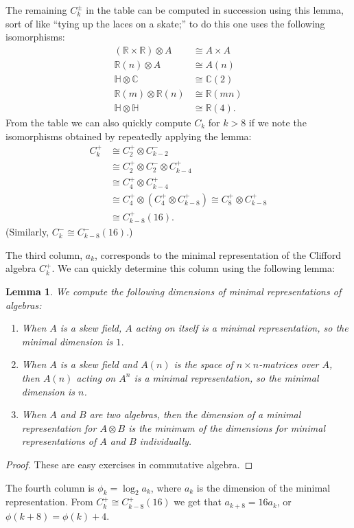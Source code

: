 \documentclass{article}
\newcommand{\C}{\mathbb{C}}
\newcommand{\R}{\mathbb{R}}
\newtheorem{lem}[thm]{Lemma}
\begin{document}
The remaining $C_k^\pm$ in the table can be computed in succession using this lemma, sort of like ``tying up the laces on a skate;'' to do this one uses the following isomorphisms:
\begin{align*}
(\R \times \R) \otimes A & \cong A \times A \\
\R(n) \otimes A & \cong A(n) \\
\mathbb{H} \otimes \C & \cong \C(2) \\
\R(m) \otimes \R(n) & \cong \R(mn) \\
\mathbb{H} \otimes \mathbb{H} & \cong \R(4).
\end{align*}
From the table we can also quickly compute $C_k$ for $k > 8$ if we note the isomorphisms obtained by repeatedly applying the lemma:
\begin{align*}
C_k^+ & \cong C_2^+ \otimes C_{k-2}^- \\
& \cong C_2^+ \otimes C_2^- \otimes C^+_{k-4} \\
& \cong C_4^+ \otimes C_{k-4}^+ \\
& \cong C_4^+ \otimes (C_4^+ \otimes C_{k-8}^+) \cong C_8^+ \otimes C_{k-8}^+ \\
& \cong C_{k-8}^+(16).
\end{align*}
(Similarly, $C_k^- \cong C_{k-8}^-(16)$.)

The third column, $a_k$, corresponds to the minimal representation of the Clifford algebra $C_k^+$.  We can quickly determine this column using the following lemma:
\begin{lem}
We compute the following dimensions of minimal representations of algebras:
\begin{enumerate}
\item When $A$ is a skew field, $A$ acting on itself is a minimal representation, so the minimal dimension is $1$.
\item When $A$ is a skew field and $A(n)$ is the space of $n \times n$-matrices over $A$, then $A(n)$ acting on $A^n$ is a minimal representation, so the minimal dimension is $n$.
\item When $A$ and $B$ are two algebras, then the dimension of a minimal representation for $A \otimes B$ is the minimum of the dimensions for minimal representations of $A$ and $B$ individually.
\end{enumerate}
\end{lem}
\begin{proof} These are easy exercises in commutative algebra. \end{proof}
The fourth column is $\phi_k = \log_2 a_k$, where $a_k$ is the dimension of the minimal representation.  From $C_k^+ \cong C_{k-8}^+(16)$ we get that $a_{k+8} = 16 a_k$, or $\phi(k + 8) = \phi(k) + 4$. %
\end{document}
